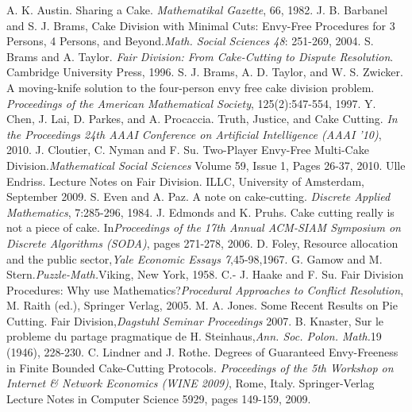 \documentclass[11pt, a4paper, twoside]{article}
\numberwithin{equation}{section}
\begin{document}
\newpage
\newpage
\thispagestyle{empty}
\thispagestyle{plain}
\renewcommand{\refname}{Literaturverzeichnis}
\begin{thebibliography}{9}
 A. K. Austin. Sharing a Cake. \emph{Mathematikal Gazette}, 66, 1982.
 J. B. Barbanel and S. J. Brams, Cake Division with Minimal Cuts: Envy-Free Procedures for 3 Persons, 4 Persons, and Beyond.\emph{Math. Social Sciences 48}: 251-269, 2004.
 S. Brams and A. Taylor. \emph{Fair Division: From Cake-Cutting to Dispute Resolution}. Cambridge University Press, 1996.
 S. J. Brams, A. D. Taylor, and W. S.
Zwicker. A moving-knife solution to the four-person envy
free cake division problem. \emph{Proceedings of the American
Mathematical Society}, 125(2):547-554, 1997.
 Y. Chen, J. Lai, D. Parkes, and A. Procaccia. Truth, Justice, and Cake Cutting. \emph{In the Proceedings 24th AAAI Conference on Artificial Intelligence (AAAI '10)}, 2010.
 J. Cloutier, C. Nyman and F. Su. Two-Player Envy-Free Multi-Cake Division.\emph{Mathematical Social Sciences}
Volume 59, Issue 1, Pages 26-37, 2010. 
 Ulle Endriss. Lecture Notes on Fair Division. ILLC, University of Amsterdam, September 2009.
 S. Even and A. Paz. A note on cake-cutting. \emph{Discrete Applied Mathematics}, 7:285-296, 1984.
 J. Edmonds and K. Pruhs. Cake
cutting really is not a piece of cake. In\emph{Proceedings of
the 17th Annual ACM-SIAM Symposium on Discrete Algorithms (SODA)}, pages 271-278, 2006.
 D. Foley, Resource allocation and the public sector,\emph{Yale Economic Essays 7},45-98,1967.
 G. Gamow and M. Stern.\emph{Puzzle-Math.}Viking, New York, 1958.
 C.- J. Haake and F. Su. Fair Division Procedures: Why use Mathematics?\emph{Procedural Approaches to Conflict Resolution}, M. Raith (ed.), Springer Verlag, 2005.
 M. A. Jones. Some Recent Results on Pie Cutting. Fair Division,\emph{Dagstuhl Seminar Proceedings} 2007.
 B.  Knaster,  Sur  le  probleme  du  partage  pragmatique  de  H.  Steinhaus,\emph{Ann.  Soc.  Polon.  Math.}19 (1946), 228-230. 
 C. Lindner and J. Rothe. Degrees of Guaranteed Envy-Freeness in Finite Bounded Cake-Cutting Protocols. \emph{Proceedings of the 5th Workshop on Internet \& Network Economics (WINE 2009)}, Rome, Italy. Springer-Verlag Lecture Notes in Computer Science 5929, pages 149-159, 2009.

\end{thebibliography}
\end{document}
